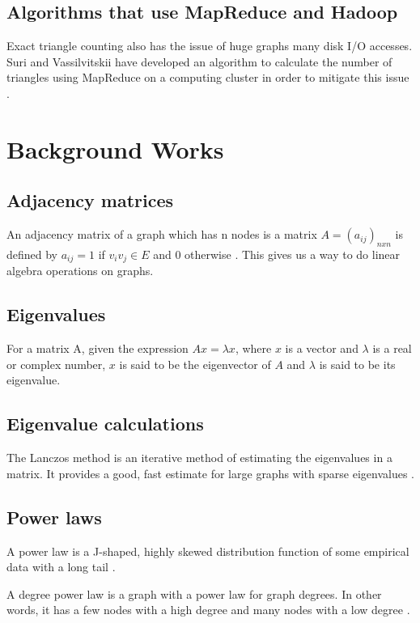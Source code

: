 \documentclass{acm_proc_article-sp}
\begin{document}
\subsection{Algorithms that use MapReduce and Hadoop}
Exact triangle counting also has the issue of huge graphs many disk I/O
accesses. Suri and Vassilvitskii have developed an algorithm to calculate the
number of triangles using MapReduce on a computing cluster in order to mitigate
this issue \cite{suri}.

\section{Background Works}

\subsection{Adjacency matrices}
An adjacency matrix of a graph which has n nodes is a matrix $A = 
(a_{ij})_{nxn}$ is defined by $a_{ij} = 1$ if $v_iv_j \in E$ and $0$ otherwise
\cite{diestel}.  This gives us a way to do linear algebra operations on graphs.

\subsection{Eigenvalues}
For a matrix A, given the expression $Ax = \lambda x$, where $x$ is a vector and
$\lambda$ is a real or complex number, $x$ is said to be the eigenvector of $A$
and $\lambda$ is said to be its eigenvalue. \cite{lovasz}

\subsection{Eigenvalue calculations}
The Lanczos method is an iterative method of estimating the eigenvalues in a
matrix. It provides a good, fast estimate for large graphs with sparse
eigenvalues \cite{golub}.

\subsection{Power laws}
A power law is a J-shaped, highly skewed distribution function of some
empirical data with a long tail \cite{simon}.

A degree power law is a graph with a power law for graph degrees. In other
words, it has a few nodes with a high degree and many nodes with a low degree
\cite{mihail}.
\end{document}
